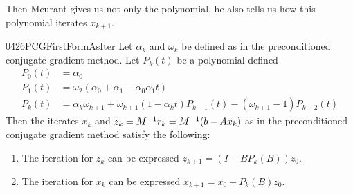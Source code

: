 \documentclass[11pt]{article}
\begin{document}
Then Meurant gives us not only the polynomial, he also tells us how this polynomial iterates $x_{k+1}$. \begin{label proposition}{0426PCGFirstFormAsIter}
Let $\alpha_k$ and $\omega_k$ be defined as in the preconditioned conjugate gradient method. Let $P_k(t)$ be a polynomial defined \begin{align*}
P_0(t) &= \alpha_0 \\
P_1(t) &= \omega_2 ( \alpha_0 + \alpha_1  - \alpha_0 \alpha_1 t) \\
P_{k}(t) &= \alpha_k \omega_{k+1} + \omega_{k+1} (1 - \alpha_k t) P_{k-1}(t)  - (\omega_{k+1} - 1)P_{k-2}(t)   
\end{align*}
Then the iterates $x_k$ and $z_k = M^{-1} r_k = M^{-1}(b - Ax_k)$  as in the preconditioned conjugate gradient method satisfy the following: \begin{enumerate}
\item The iteration for $z_k$ can be expressed $z_{k+1} = (I - B P_k(B)) z_0$.
\item The iteration for $x_k$ can be expressed $x_{k+1} = x_0 + P_k(B) z_0$.
\end{enumerate}
\end{label proposition}
\end{document}
